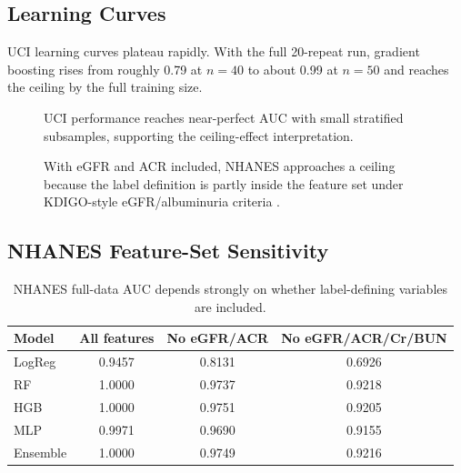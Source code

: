 \documentclass[12pt]{article}
\newcommand{\DataDir}{../outputs/latex_data}
\newcommand{\PlotFiveModelCurves}[1]{
  \addplot+[mark=o, thick, color=LogRegColor] table[x=train_size,y=LogReg_test] {#1};
  \addlegendentry{Logistic}
  \addplot+[mark=square*, thick, color=RFColor] table[x=train_size,y=RF_test] {#1};
  \addlegendentry{Random forest}
  \addplot+[mark=triangle*, thick, color=HGBColor] table[x=train_size,y=HGB_test] {#1};
  \addlegendentry{Gradient boosting}
  \addplot+[mark=diamond*, thick, color=MLPColor] table[x=train_size,y=MLP_test] {#1};
  \addlegendentry{MLP}
  \addplot+[mark=*, thick, color=EnsColor] table[x=train_size,y=Ensemble_test] {#1};
  \addlegendentry{Ensemble}
}
\begin{document}
\subsection{Learning Curves}
UCI learning curves plateau rapidly. With the full 20-repeat run, gradient boosting rises from roughly 0.79 at $n=40$ to about 0.99 at $n=50$ and reaches the ceiling by the full training size.

\begin{figure}[H]
\centering
{}
\caption{UCI performance reaches near-perfect AUC with small stratified subsamples, supporting the ceiling-effect interpretation.}
\end{figure}

\begin{figure}[H]
\centering
{}
\caption{With eGFR and ACR included, NHANES approaches a ceiling because the label definition is partly inside the feature set under KDIGO-style eGFR/albuminuria criteria \cite{kdigo2024}.}
\end{figure}

\subsection{NHANES Feature-Set Sensitivity}
\begin{table}[H]
\centering
\caption{NHANES full-data AUC depends strongly on whether label-defining variables are included.}
\begingroup
\small
\renewcommand{\arraystretch}{1.15}
\setlength{\tabcolsep}{7pt}
\begin{tabular}{|l|c|c|c|}
\hline
Model & All features & No eGFR/ACR & No eGFR/ACR/Cr/BUN \\
\hline
LogReg & 0.9457 & 0.8131 & 0.6926 \\
RF & 1.0000 & 0.9737 & 0.9218 \\
HGB & 1.0000 & 0.9751 & 0.9205 \\
MLP & 0.9971 & 0.9690 & 0.9155 \\
Ensemble & 1.0000 & 0.9749 & 0.9216 \\
\hline
\end{tabular}
\endgroup
\end{table}
\end{document}
